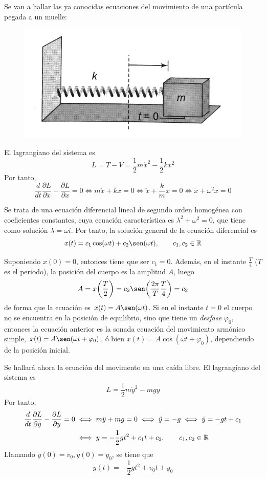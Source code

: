 \documentclass[12pt]{report}
\begin{document}
\begin{example}

Se van a hallar las ya conocidas ecuaciones del movimiento de una partícula pegada a un muelle:

\begin{figure}[h]
\includegraphics[scale = 0.075]{2.1_1}
\centering
\end{figure}

\noindent El lagrangiano del sistema es
\[L = T- V= \frac{1}{2}m\dot{x}^2 - \frac{1}{2}kx^2\]
Por tanto,
\[
\frac{d}{dt}\frac{\partial L}{\partial \dot{x}} - \frac{\partial L}{\partial x} = 0 \iff m \ddot{x} + kx = 0 \iff \ddot{x} + \frac{k}{m}x = 0 \iff \ddot{x}+\omega^2 x = 0
\]

Se trata de una ecuación diferencial lineal de segundo orden homogénea con coeficientes constantes, cuya ecuación característica es $\lambda^2+\omega^2 = 0$, que tiene como solución $\lambda = \omega i$. Por tanto, la solución general de la ecuación diferencial es
\[x(t) = c_1 \cos(\omega t) + c_2 \sen(\omega t), \qquad c_1,c_2 \in \R\]

Suponiendo $x(0) = 0$, entonces tiene que ser $c_1 = 0$. Además, en el instante $\frac{T}{4}$ ($T$ es el periodo), la posición del cuerpo es la amplitud $A$, luego 
\[A = x\biggr(\frac{T}{2}\biggr) = c_2 \sen\biggl(\frac{2\pi}{T}\frac{T}{4}\biggr) = c_2 \]
de forma que la ecuación es $x(t) = A \sen(\omega t)$. Si en el instante $t = 0$ el cuerpo no se encuentra en la posición de equilibrio, sino que tiene un \textit{desfase} $\varphi_0$, entonces la ecuación anterior es la sonada ecuación del movimiento armónico simple, $x(t) = A \sen(\omega t + \varphi_0)$, ó bien $x(t) = A \cos(\omega t + \varphi_0)$, dependiendo de la posición inicial.

\end{example}

\begin{example}

Se hallará ahora la ecuación del movimento en una caída libre. El lagrangiano del sistema es
\[L = \frac{1}{2}m\dot{y}^2-mgy\]
Por tanto,
\[
\begin{aligned}[t]
\frac{d}{dt}\frac{\partial L}{\partial \dot{y}} - \frac{\partial L}{\partial y} = 0 &\iff m \ddot{y} +mg = 0 \iff \ddot{y} = -g \iff \dot{y} = -gt + c_1 \\
&\iff y = -\frac{1}{2}gt^2+c_1t+c_2, \qquad c_1, c_2 \in \mathbb R
\end{aligned}
\]
Llamando $\dot{y}(0) = v_0, y(0) = y_0$, se tiene que
\[y(t) = -\frac{1}{2}gt^2+v_0t+y_0\]
\end{example}
\end{document}
